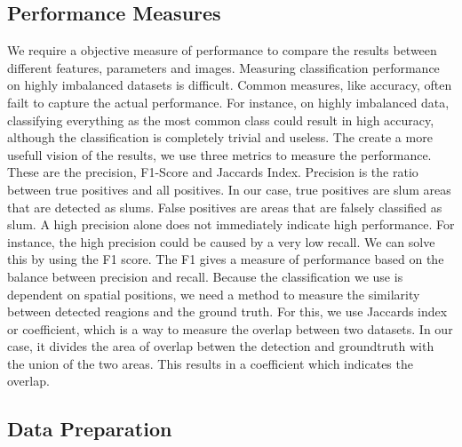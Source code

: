 \subsection{Performance Measures}
We require a objective measure of performance to compare the results between different features, parameters and images. Measuring classification performance on highly imbalanced datasets is difficult. Common measures, like accuracy, often failt to capture the actual performance. For instance, on highly imbalanced data, classifying everything as the most common class could result in high accuracy, although the classification is completely trivial and useless. The create a more usefull vision of the results, we use three metrics to measure the performance. These are the precision, F1-Score and Jaccards Index. Precision is the ratio between true positives and all positives. In our case, true positives are slum areas that are detected as slums. False positives are areas that are falsely classified as slum. 
A high precision alone does not immediately indicate high performance. For instance, the high precision could be caused by a very low recall. We can solve this by using the F1 score. The F1 gives a measure of performance based on the balance between precision and recall.
Because the classification we use is dependent on spatial positions, we need a method to measure the similarity between detected reagions and the ground truth.
For this, we use Jaccards index or coefficient, which is a way to measure the overlap between two datasets. In our case, it divides the area of overlap betwen the detection and groundtruth with the union of the two areas. This results in a coefficient which indicates the overlap.


\subsection{Data Preparation}


